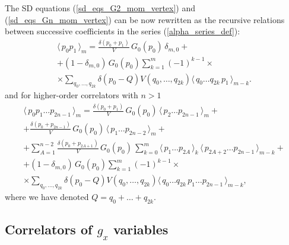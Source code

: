 \documentclass[12pt]{article}
\newcommand{\lr}[1]{ \left( #1 \right) }
\newcommand{\vev}[1]{ \langle \, #1 \, \rangle }
\begin{document}
The SD equations (\ref{sd_eqs_G2_mom_vertex}) and (\ref{sd_eqs_Gn_mom_vertex}) can be now rewritten as the recursive relations between successive coefficients in the series (\ref{alpha_series_def}):
\begin{eqnarray}
\label{sd_eqs_G2_mom_vertex_alg}
 \vev{p_0 p_1}_m = \frac{\delta\lr{p_0 + p_1}}{V} \, G_0\lr{p_0} \, \delta_{m,0}
 + \nonumber \\ +
 \lr{1 - \delta_{m,0}} \,
 G_0\lr{p_0} \sum\limits_{k=1}^{m} \lr{-1}^{k-1}
 \times \nonumber \\ \times
 \sum\limits_{q_0, \ldots, q_{2 k}}
 \delta\lr{p_0 - Q}
 V\lr{q_0, \ldots, q_{2 k}}
 \vev{q_0 \ldots q_{2 k} \, p_1}_{m-k} .
\end{eqnarray}
and for higher-order correlators with $n > 1$
\begin{eqnarray}
\label{sd_eqs_Gn_mom_vertex_alg}
 \vev{p_0 p_1 \ldots p_{2n-1}}_m
 =
 \frac{\delta\lr{p_0 + p_1}}{V} \, G_0\lr{p_0} \, \vev{p_2 \ldots p_{2n-1}}_m
 + \nonumber \\ +
 \frac{\delta\lr{p_0 + p_{2n-1}}}{V} \, G_0\lr{p_0} \, \vev{p_1 \ldots p_{2n-2}}_m
 + \nonumber \\ +
 \sum\limits_{A=1}^{n-2}
 \frac{\delta\lr{p_0 + p_{2A+1}}}{V} \, G_0\lr{p_0} \,
 \sum\limits_{k=0}^m
 \vev{p_1 \ldots p_{2A}}_k \, \vev{p_{2 A+2} \ldots p_{2n-1}}_{m-k}
 + \nonumber \\ +
 \lr{1 - \delta_{m,0}} \,
 G_0\lr{p_0} \sum\limits_{k=1}^{m} \lr{-1}^{k-1}
 \times \nonumber \\ \times
 \sum\limits_{q_0, \ldots, q_{2 k}}
 \delta\lr{p_0 - Q}
 V\lr{q_0, \ldots, q_{2 k}}
 \vev{q_0 \ldots q_{2 k} \, p_1  \ldots p_{2n-1}}_{m-k} ,
\end{eqnarray}
where we have denoted $Q = q_0 + \ldots + q_{2 k}$.


\subsection{Correlators of $g_x$ variables}
\label{subsec:gx_correlators_momentum}
\end{document}
